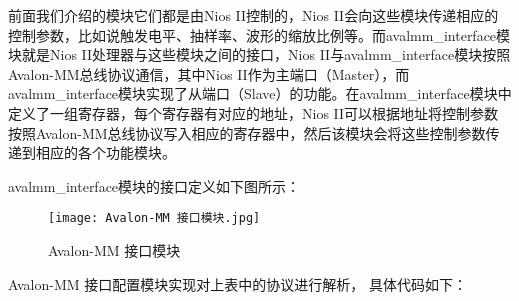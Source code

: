 \documentclass[lang=cn,a4paper,newtx]{elegantpaper}
\begin{document}
前面我们介绍的模块它们都是由Nios II控制的，Nios II会向这些模块传递相应的控制参数，比如说触发电平、抽样率、波形的缩放比例等。而avalmm\_interface模块就是Nios II处理器与这些模块之间的接口，Nios II与avalmm\_interface模块按照Avalon-MM总线协议通信，其中Nios II作为主端口（Master），而avalmm\_interface模块实现了从端口（Slave）的功能。在avalmm\_interface模块中定义了一组寄存器，每个寄存器有对应的地址，Nios II可以根据地址将控制参数按照Avalon-MM总线协议写入相应的寄存器中，然后该模块会将这些控制参数传递到相应的各个功能模块。

avalmm\_interface模块的接口定义如下图所示：
  \begin{figure}[!htb]
	\centering
	\caption{Avalon-MM 接口模块}
	\label{Avalon-MM 接口模块}
	\texttt{[image: Avalon-MM 接口模块.jpg]}
\end{figure}
Avalon-MM 接口配置模块实现对上表中的协议进行解析， 具体代码如下：
\end{document}
